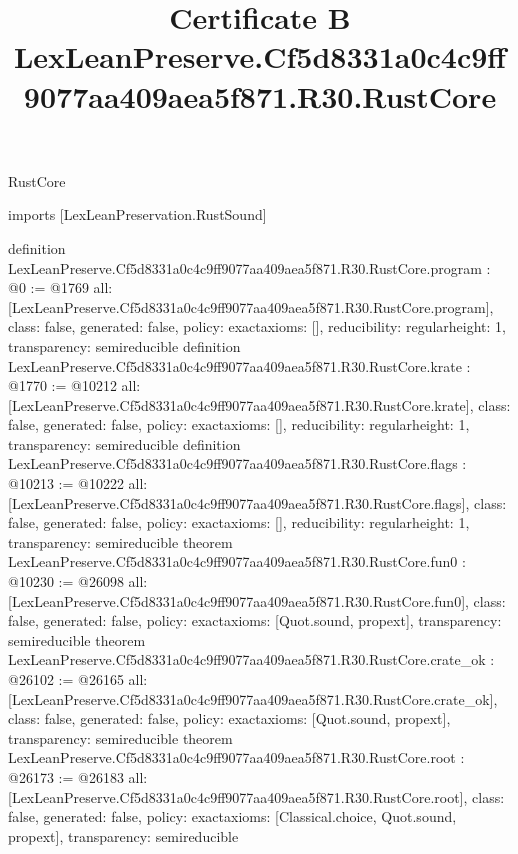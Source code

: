 \begin{lexlean}{RustCore}
\title{Certificate B LexLeanPreserve.Cf5d8331a0c4c9ff9077aa409aea5f871.R30.RustCore}
\begin{coremodule}
imports [LexLeanPreservation.RustSound]

definition LexLeanPreserve.Cf5d8331a0c4c9ff9077aa409aea5f871.R30.RustCore.program : @0 := @1769 {
  all: [LexLeanPreserve.Cf5d8331a0c4c9ff9077aa409aea5f871.R30.RustCore.program],
  class: false,
  generated: false,
  policy: exact{axioms: []},
  reducibility: regular{height: 1},
  transparency: semireducible
}
definition LexLeanPreserve.Cf5d8331a0c4c9ff9077aa409aea5f871.R30.RustCore.krate : @1770 := @10212 {
  all: [LexLeanPreserve.Cf5d8331a0c4c9ff9077aa409aea5f871.R30.RustCore.krate],
  class: false,
  generated: false,
  policy: exact{axioms: []},
  reducibility: regular{height: 1},
  transparency: semireducible
}
definition LexLeanPreserve.Cf5d8331a0c4c9ff9077aa409aea5f871.R30.RustCore.flags : @10213 := @10222 {
  all: [LexLeanPreserve.Cf5d8331a0c4c9ff9077aa409aea5f871.R30.RustCore.flags],
  class: false,
  generated: false,
  policy: exact{axioms: []},
  reducibility: regular{height: 1},
  transparency: semireducible
}
theorem LexLeanPreserve.Cf5d8331a0c4c9ff9077aa409aea5f871.R30.RustCore.fun0 : @10230 := @26098 {
  all: [LexLeanPreserve.Cf5d8331a0c4c9ff9077aa409aea5f871.R30.RustCore.fun0],
  class: false,
  generated: false,
  policy: exact{axioms: [Quot.sound, propext]},
  transparency: semireducible
}
theorem LexLeanPreserve.Cf5d8331a0c4c9ff9077aa409aea5f871.R30.RustCore.crate_ok : @26102 := @26165 {
  all: [LexLeanPreserve.Cf5d8331a0c4c9ff9077aa409aea5f871.R30.RustCore.crate_ok],
  class: false,
  generated: false,
  policy: exact{axioms: [Quot.sound, propext]},
  transparency: semireducible
}
theorem LexLeanPreserve.Cf5d8331a0c4c9ff9077aa409aea5f871.R30.RustCore.root : @26173 := @26183 {
  all: [LexLeanPreserve.Cf5d8331a0c4c9ff9077aa409aea5f871.R30.RustCore.root],
  class: false,
  generated: false,
  policy: exact{axioms: [Classical.choice, Quot.sound, propext]},
  transparency: semireducible
}


\end{coremodule}
\end{lexlean}
